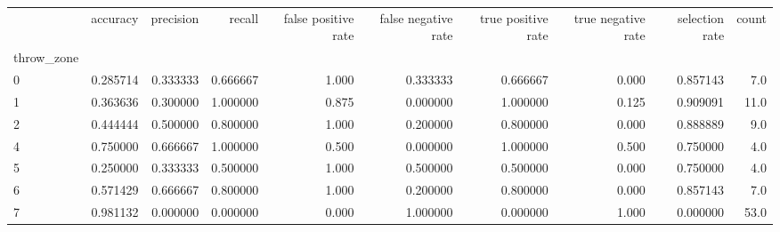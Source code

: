 \begin{tabular}{lrrrrrrrrr}
\toprule
{} &  accuracy &  precision &    recall &  false positive rate &  false negative rate &  true positive rate &  true negative rate &  selection rate &  count \\
throw\_zone &           &            &           &                      &                      &                     &                     &                 &        \\
\midrule
0          &  0.285714 &   0.333333 &  0.666667 &                1.000 &             0.333333 &            0.666667 &               0.000 &        0.857143 &    7.0 \\
1          &  0.363636 &   0.300000 &  1.000000 &                0.875 &             0.000000 &            1.000000 &               0.125 &        0.909091 &   11.0 \\
2          &  0.444444 &   0.500000 &  0.800000 &                1.000 &             0.200000 &            0.800000 &               0.000 &        0.888889 &    9.0 \\
4          &  0.750000 &   0.666667 &  1.000000 &                0.500 &             0.000000 &            1.000000 &               0.500 &        0.750000 &    4.0 \\
5          &  0.250000 &   0.333333 &  0.500000 &                1.000 &             0.500000 &            0.500000 &               0.000 &        0.750000 &    4.0 \\
6          &  0.571429 &   0.666667 &  0.800000 &                1.000 &             0.200000 &            0.800000 &               0.000 &        0.857143 &    7.0 \\
7          &  0.981132 &   0.000000 &  0.000000 &                0.000 &             1.000000 &            0.000000 &               1.000 &        0.000000 &   53.0 \\
\bottomrule
\end{tabular}
